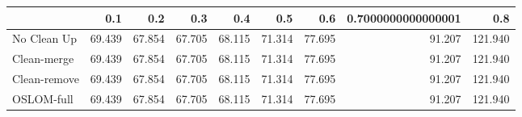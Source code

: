 \begin{tabular}{lrrrrrrrr}
\toprule
{} &    0.1 &    0.2 &    0.3 &    0.4 &    0.5 &    0.6 & 0.7000000000000001 &     0.8 \\
\midrule
No Clean Up  & 69.439 & 67.854 & 67.705 & 68.115 & 71.314 & 77.695 &             91.207 & 121.940 \\
Clean-merge  & 69.439 & 67.854 & 67.705 & 68.115 & 71.314 & 77.695 &             91.207 & 121.940 \\
Clean-remove & 69.439 & 67.854 & 67.705 & 68.115 & 71.314 & 77.695 &             91.207 & 121.940 \\
OSLOM-full   & 69.439 & 67.854 & 67.705 & 68.115 & 71.314 & 77.695 &             91.207 & 121.940 \\
\bottomrule
\end{tabular}
